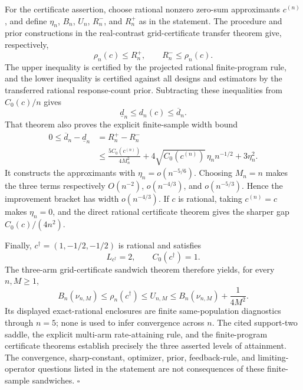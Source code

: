 For the certificate assertion, choose rational nonzero zero-sum approximants \(c^{(n)}\), and define \(\eta_n\), \(B_n\), \(U_n\), \(R_n^-\), and \(R_n^+\) as in the statement.  The procedure and prior constructions in the real-contrast grid-certificate transfer theorem give, respectively,
\[
 \rho_n(c)\leq R_n^+,
 \qquad
 R_n^-\leq\rho_n(c).
\]
The upper inequality is certified by the projected rational finite-program rule, and the lower inequality is certified against all designs and estimators by the transferred rational response-count prior.  Subtracting these inequalities from \(C_0(c)/n\) gives
\[
 \underline d_n\leq d_n(c)\leq\overline d_n.
\]
That theorem also proves the explicit finite-sample width bound
\[
 \begin{aligned}
 0\leq\overline d_n-\underline d_n
 &=R_n^+-R_n^-\\
 &\leq\frac{5C_0(c^{(n)})}{4M_n^2}
 +4\sqrt{C_0(c^{(n)})}\,\eta_n n^{-1/2}
 +3\eta_n^2.
 \end{aligned}
\]
It constructs the approximants with \(\eta_n=o(n^{-5/6})\).  Choosing \(M_n=n\) makes the three terms respectively \(O(n^{-2})\), \(o(n^{-4/3})\), and \(o(n^{-5/3})\).  Hence the improvement bracket has width \(o(n^{-4/3})\).  If \(c\) is rational, taking \(c^{(n)}=c\) makes \(\eta_n=0\), and the direct rational certificate theorem gives the sharper gap \(C_0(c)/(4n^2)\).

Finally, \(c^\dagger=(1,-1/2,-1/2)\) is rational and satisfies
\[
 L_{c^\dagger}=2,
 \qquad C_0(c^\dagger)=1.
\]
The three-arm grid-certificate sandwich theorem therefore yields, for every \(n,M\geq1\),
\[
 B_n(\nu_{n,M})\leq\rho_n(c^\dagger)\leq U_{n,M}
 \leq B_n(\nu_{n,M})+\frac1{4M^2}.
\]
Its displayed exact-rational enclosures are finite same-population diagnostics through \(n=5\); none is used to infer convergence across \(n\).  The cited support-two saddle, the explicit multi-arm rate-attaining rule, and the finite-program certificate theorems establish precisely the three asserted levels of attainment.  The convergence, sharp-constant, optimizer, prior, feedback-rule, and limiting-operator questions listed in the statement are not consequences of these finite-sample sandwiches. \(\square\)